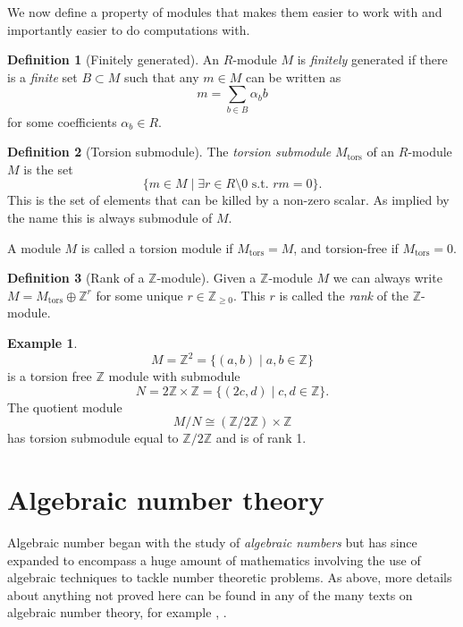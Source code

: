 \documentclass[a4paper,abstracton]{scrreprt}
\theoremstyle{definition}
\newtheorem{defn}{Definition}
\newtheorem{ex}{Example}
\newcommand{\ZZ}{\mathbb{Z}}
\begin{document}
We now define a property of modules that makes them easier to work with and importantly easier to do computations with.

\begin{defn}[Finitely generated]
An $R$-module $M$ is \emph{finitely} generated if there is a \emph{finite} set $B\subset M$ such that any $m\in M$ can be written as
\[m = \sum_{b\in B} \alpha_b b\]
for some coefficients $\alpha_b \in R$.
\end{defn}

\begin{defn}[Torsion submodule]
The \emph{torsion submodule} $M_\text{tors}$ of an $R$-module $M$ is the set
\[
\{m\in M \mid \exists r \in R\setminus 0 \text{ s.t. } rm = 0\}.
\]
This is the set of elements that can be killed by a non-zero scalar.
As implied by the name this is always submodule of $M$.
\end{defn}

A module $M$ is called a torsion module if $M_\text{tors} = M$, and torsion-free if $M_\text{tors} = 0$.


\begin{defn}[Rank of a $\ZZ$-module]
Given a $\ZZ$-module $M$ we can always write $M = M_\text{tors} \oplus \ZZ^r$ for some unique $r\in \ZZ_{\ge 0}$.
This $r$ is called the \emph{rank} of the $\ZZ$-module.
\end{defn}

\begin{ex}
\[M = \ZZ^2 = \{(a,b)\mid a,b\in \ZZ\}\]
is a torsion free $\ZZ$ module with submodule
\[N = 2\ZZ\times \ZZ = \{(2c,d) \mid c,d\in\ZZ\}.\]
The quotient module
\[M/N \cong (\ZZ/2\ZZ)\times \ZZ\]
has torsion submodule equal to $\ZZ/2\ZZ$ and is of rank 1.
\end{ex}

\section{Algebraic number theory}

Algebraic number began with the study of \emph{algebraic numbers} but has since expanded to encompass a huge amount of mathematics involving the use of algebraic techniques to tackle number theoretic problems. %
As above, more details about anything not proved here can be found in any of the many texts on algebraic number theory, for example \cite{neukirch}, \cite{lang}.
\end{document}
